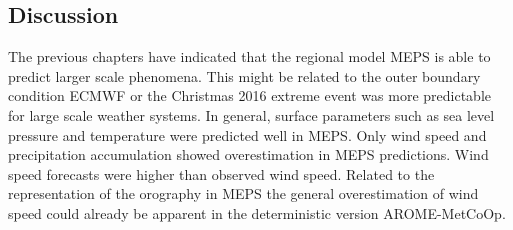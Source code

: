 \subsection{Discussion}\label{sec:res:oro_infl}
The previous chapters have indicated that the regional model MEPS is able to predict larger scale phenomena. This might be related to the outer boundary condition ECMWF or the Christmas 2016 extreme event was more predictable for large scale weather systems. In general, surface parameters such as sea level pressure and temperature were predicted well in MEPS. Only wind speed and precipitation accumulation showed overestimation in MEPS predictions. Wind speed forecasts were higher than observed wind speed. Related to the representation of the orography in MEPS the general overestimation of wind speed could already be apparent in the deterministic version AROME-MetCoOp.
\\
\\
